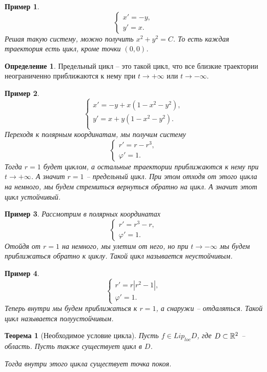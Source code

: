 \documentclass[a5paper, 10pt]{article}
\theoremstyle{definition}
\newtheorem{Def}{Определение}
\theoremstyle{plain}
\newtheorem{Th}{Теорема}
\newtheorem{Ex}{Пример}
\theoremstyle{remark}
\begin{document}
	\begin{Ex}
		\[
	\begin{cases}
			x' = -y,\\
		y' = x.
	\end{cases}
		\]
		Решая такую систему, можно получить $x^2+y^2=C$. То есть каждая траектория есть цикл, кроме точки $(0,0)$.
	\end{Ex}
	\begin{Def}
		Предельный цикл -- это такой цикл, что все близкие траектории неограниченно приближаются к нему при $t\to +\infty$ или $t\to -\infty$.
	\end{Def}
	\begin{Ex}
		\[
		\begin{cases}
			x' = -y + x(1-x^2-y^2),\\
			y' = x + y(1-x^2-y^2).\\
		\end{cases}
		\]
		Переходя к полярным координатам, мы получим систему
		\[
		\begin{cases}
			r' = r-r^3,\\
			\varphi' = 1.
		\end{cases}
		\]
		Тогда $r = 1$ будет циклом, а остальные траектории приближаются к нему при $t\to +\infty$. А значит $r=1$ -- предельный цикл. При этом отходя от этого цикла на немного, мы будем стремиться вернуться обратно на цикл. А значит этот цикл устойчивый.
	\end{Ex}
	\begin{Ex}
		Рассмотрим в полярных координатах
		\[
		\begin{cases}
			r' = r^3-r,\\
			\varphi' = 1.
		\end{cases}
		\]
		Отойдя от $r=1$ на немного, мы улетим от него, но при $t\to-\infty$ мы будем приближаться обратно к циклу. Такой цикл называется неустойчивым.
	\end{Ex}
	\begin{Ex}
		\[
		\begin{cases}
			r' = r|r^2-1|,\\
			\varphi' = 1.
		\end{cases}
		\]
		Теперь внутри мы будем приближаться к $r=1$, а снаружи -- отдаляться. Такой цикл называется полуустойчивым.
	\end{Ex}
	
	\begin{Th}[Необходимое условие цикла]
		Пусть $f\in Lip_{loc} D$, где $D \subset \mathbb{R}^2$ -- область. Пусть также существует цикл в $D$. 
		
		Тогда внутри этого цикла существует точка покоя.
	\end{Th}
	
\end{document}
